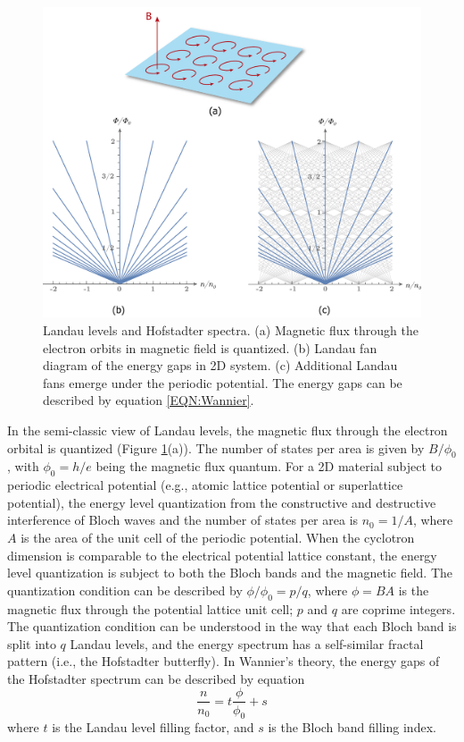 \documentclass[pdflatex, sectionletters, 12pt, final, phd]{pittetd}    %
\begin{document}
\begin{figure}[h!]
	\centering
	\includegraphics[width=1.0\textwidth]{Drawing/HofstadterLandau.pdf}
	\caption[Landau levels and Hofstadter spectra]{Landau levels and Hofstadter spectra. (a) Magnetic flux through the electron orbits in magnetic field is quantized. (b) Landau fan diagram of the energy gaps in 2D system. (c) Additional Landau fans emerge under the periodic potential. The energy gaps can be described by equation \ref{EQN:Wannier}.}
	\label{FIG:HofstadterLandau}
\end{figure}

In the semi-classic view of Landau levels, the magnetic flux through the electron orbital is quantized (Figure \ref{FIG:HofstadterLandau}(a)). The number of states per area is given by $B/\phi_0$, with $\phi_0 = h/e$ being the magnetic flux quantum. For a 2D material subject to periodic electrical potential (e.g., atomic lattice potential or superlattice potential), the energy level quantization from the constructive and destructive interference of Bloch waves and the number of states per area is $n_0 = 1/A$, where $A$ is the area of the unit cell of the periodic potential\cite{hofstadter1976energy}. When the cyclotron dimension is comparable to the electrical potential lattice constant, the energy level quantization is subject to both the Bloch bands and the magnetic field. The quantization condition can be described by $\phi/\phi_0 = p/q$, where $\phi = BA$ is the magnetic flux through the potential lattice unit cell; $p$ and $q$ are coprime integers\cite{hofstadter1976energy}. The quantization condition can be understood in the way that each Bloch band is split into $q$ Landau levels, and the energy spectrum has a self-similar fractal pattern (i.e., the Hofstadter butterfly). In Wannier's theory\cite{wannier1978result}, the energy gaps of the Hofstadter spectrum can be described by equation 
\begin{equation}
\label{EQN:Wannier}
\frac{n}{n_0} = t\frac{\phi}{\phi_0} + s
\end{equation}
where $t$ is the Landau level filling factor, and $s$ is the Bloch band filling index\cite{streda1982quantised, thouless1984quantized}.
\end{document}
